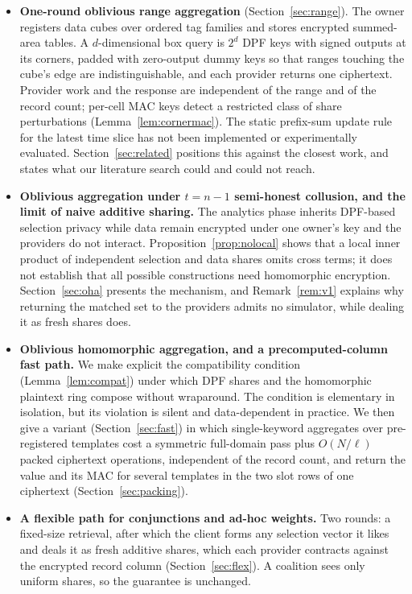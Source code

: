 \documentclass[a4paper,fleqn]{cas-sc}
\begin{document}
\begin{itemize}
\item \textbf{One-round oblivious range aggregation} (Section~\ref{sec:range}).
The owner registers data cubes over ordered tag families and stores encrypted
summed-area tables. A $d$-dimensional box query is $2^d$ DPF keys with signed
outputs at its corners, padded with zero-output dummy keys so that ranges
touching the cube's edge are indistinguishable, and each provider returns one
ciphertext. Provider work and the response are independent of the range and of
the record count; per-cell MAC keys detect a restricted class of share perturbations
(Lemma~\ref{lem:cornermac}). The static prefix-sum update rule for the
latest time slice has not been implemented or experimentally evaluated. Section~\ref{sec:related} positions this against the closest work,
and states what our literature search could and could not reach.

\item \textbf{Oblivious aggregation under $t=n-1$ semi-honest
collusion, and the limit of naive additive sharing.}
The analytics phase inherits DPF-based selection privacy while data remain
encrypted under one owner's key and the providers do not interact.
Proposition~\ref{prop:nolocal} shows that a local inner product of
independent selection and data shares omits cross terms; it does not
establish that all possible constructions need homomorphic encryption.
Section~\ref{sec:oha} presents the mechanism, and Remark~\ref{rem:v1}
explains why returning the matched set to the providers admits no simulator,
while dealing it as fresh shares does.

\item \textbf{Oblivious homomorphic aggregation, and a precomputed-column fast
path.} We make explicit the compatibility condition (Lemma~\ref{lem:compat})
under which DPF shares and the homomorphic plaintext ring compose without
wraparound. The condition is elementary in isolation, but its violation is
silent and data-dependent in practice. We then give a variant
(Section~\ref{sec:fast}) in which single-keyword aggregates over pre-registered
templates cost a symmetric full-domain pass plus $O(N/\ell)$ packed ciphertext
operations, independent of the record count, and return the value and its MAC
for several templates in the two slot rows of one ciphertext
(Section~\ref{sec:packing}).

\item \textbf{A flexible path for conjunctions and ad-hoc weights.} Two rounds:
a fixed-size retrieval, after which the client forms any selection vector it
likes and deals it as fresh additive shares, which each provider contracts
against the encrypted record column (Section~\ref{sec:flex}). A coalition sees
only uniform shares, so the guarantee is unchanged.


\end{itemize}
\end{document}
